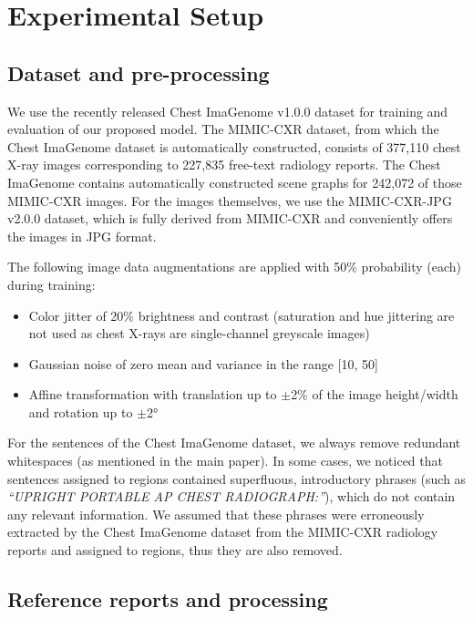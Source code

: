 \documentclass[10pt,twocolumn,letterpaper]{article}
\begin{document}
\section{Experimental Setup}\label{appendix:exp_setup}

\subsection{Dataset and pre-processing}

We use the recently released Chest ImaGenome v1.0.0 \cite{wu2021chest, wu2021chestphysio, PhysioNet} dataset for training and evaluation of our proposed model. The MIMIC-CXR \cite{johnson2019mimic, johnson2019mimicphysio} dataset, from which the Chest ImaGenome dataset is automatically constructed, consists of 377,110 chest X-ray images corresponding to 227,835 free-text radiology reports. The Chest ImaGenome contains automatically constructed scene graphs for 242,072 of those MIMIC-CXR images. For the images themselves, we use the MIMIC-CXR-JPG v2.0.0 \cite{johnson2019mimicjpg, johnson2019mimicjpgphysio} dataset, which is fully derived from MIMIC-CXR and conveniently offers the images in JPG format.

The following image data augmentations are applied with 50\% probability (each) during training:

\begin{itemize}
    \item Color jitter of 20\% brightness and contrast (saturation and hue jittering are not used as chest X-rays are single-channel greyscale images)
    \item Gaussian noise of zero mean and variance in the range [10, 50]
    \item Affine transformation with translation up to $\pm$2\% of the image height/width and rotation up to $\pm$2°
\end{itemize}

For the sentences of the Chest ImaGenome dataset, we always remove redundant whitespaces (as mentioned in the main paper). In some cases, we noticed that sentences assigned to regions contained superfluous, introductory phrases (such as \emph{“UPRIGHT PORTABLE AP CHEST RADIOGRAPH:”}), which do not contain any relevant information. We assumed that these phrases were erroneously extracted by the Chest ImaGenome dataset from the MIMIC-CXR radiology reports and assigned to regions, thus they are also removed.

\subsection{Reference reports and processing}\label{appendix:report_processing}
\end{document}
